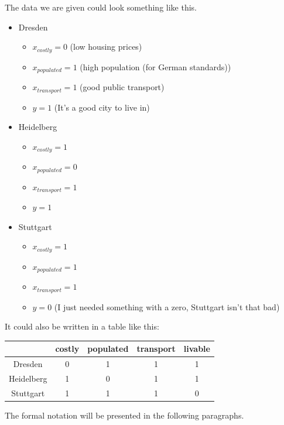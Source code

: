 \documentclass{article}
\begin{document}
The data we are given could look something like this.
\begin{itemize}
    \item Dresden
    \begin{itemize}
        \item $x_{costly} = 0$ (low housing prices)
        \item $x_{populated} = 1$ (high population (for German standards))
        \item $x_{transport} = 1$ (good public transport)
        \item $y = 1$ (It's a good city to live in)
    \end{itemize}
    
    \item Heidelberg
    \begin{itemize}
        \item $x_{costly} = 1$
        \item $x_{populated} = 0$
        \item $x_{transport} = 1$
        \item $y = 1$
    \end{itemize}
    
    \item Stuttgart
    \begin{itemize}
        \item $x_{costly} = 1$
        \item $x_{populated} = 1$
        \item $x_{transport} = 1$
        \item $y = 0$ (I just needed something with a zero, Stuttgart isn't that bad)
    \end{itemize}
\end{itemize}

It could also be written in a table like this:

\begin{center}
    \begin{tabular}{c || c c c | c}
        & costly & populated & transport & livable \\
        \hline
        \hline
        Dresden & 0 & 1 & 1 & 1 \\
        Heidelberg & 1 & 0 & 1 & 1 \\
        Stuttgart & 1 & 1 & 1 & 0 \\
    \end{tabular}
\end{center}


The formal notation will be presented in the following paragraphs.
\end{document}
